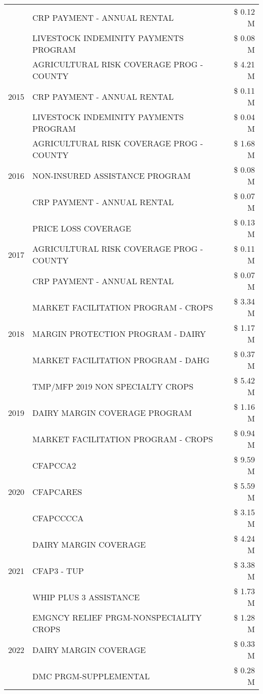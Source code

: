 \begin{tabular}{llr}
 & CRP PAYMENT - ANNUAL RENTAL & \$ 0.12 M \\
 & LIVESTOCK INDEMINITY PAYMENTS PROGRAM & \$ 0.08 M \\
\cline{1-3}
\multirow[t]{3}{*}{2015} & AGRICULTURAL RISK COVERAGE PROG - COUNTY & \$ 4.21 M \\
 & CRP PAYMENT - ANNUAL RENTAL & \$ 0.11 M \\
 & LIVESTOCK INDEMINITY PAYMENTS PROGRAM & \$ 0.04 M \\
\cline{1-3}
\multirow[t]{3}{*}{2016} & AGRICULTURAL RISK COVERAGE PROG - COUNTY & \$ 1.68 M \\
 & NON-INSURED ASSISTANCE PROGRAM & \$ 0.08 M \\
 & CRP PAYMENT - ANNUAL RENTAL & \$ 0.07 M \\
\cline{1-3}
\multirow[t]{3}{*}{2017} & PRICE LOSS COVERAGE & \$ 0.13 M \\
 & AGRICULTURAL RISK COVERAGE PROG - COUNTY & \$ 0.11 M \\
 & CRP PAYMENT - ANNUAL RENTAL & \$ 0.07 M \\
\cline{1-3}
\multirow[t]{3}{*}{2018} & MARKET FACILITATION PROGRAM - CROPS & \$ 3.34 M \\
 & MARGIN PROTECTION PROGRAM - DAIRY & \$ 1.17 M \\
 & MARKET FACILITATION PROGRAM - DAHG & \$ 0.37 M \\
\cline{1-3}
\multirow[t]{3}{*}{2019} & TMP/MFP 2019 NON SPECIALTY CROPS & \$ 5.42 M \\
 & DAIRY MARGIN COVERAGE PROGRAM & \$ 1.16 M \\
 & MARKET FACILITATION PROGRAM - CROPS & \$ 0.94 M \\
\cline{1-3}
\multirow[t]{3}{*}{2020} & CFAPCCA2 & \$ 9.59 M \\
 & CFAPCARES & \$ 5.59 M \\
 & CFAPCCCCA & \$ 3.15 M \\
\cline{1-3}
\multirow[t]{3}{*}{2021} & DAIRY MARGIN COVERAGE & \$ 4.24 M \\
 & CFAP3 - TUP & \$ 3.38 M \\
 & WHIP PLUS 3 ASSISTANCE & \$ 1.73 M \\
\cline{1-3}
\multirow[t]{3}{*}{2022} & EMGNCY RELIEF PRGM-NONSPECIALITY CROPS & \$ 1.28 M \\
 & DAIRY MARGIN COVERAGE & \$ 0.33 M \\
 & DMC PRGM-SUPPLEMENTAL & \$ 0.28 M \\
\cline{1-3}
\bottomrule
\end{tabular}
